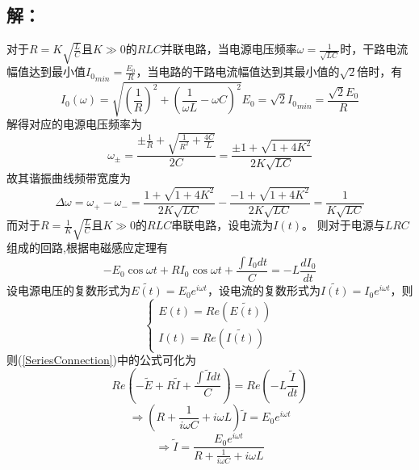 \documentclass[10pt,a4paper]{article}
\theoremstyle{remark}
\begin{document}
\subsection{解：}
对于$R = K\sqrt{\frac{L}{C}}$且$K\gg 0$的$RLC$并联电路，当电源电压频率$\omega = \frac{1}{\sqrt{LC}}$时，干路电流幅值达到最小值${I_0}_{min} = \frac{E_0}{R}$，当电路的干路电流幅值达到其最小值的$\sqrt{2}$倍时，有
\[
I_0(\omega) = \sqrt{(\frac{1}{R})^2+(\frac{1}{\omega L}-\omega C)^2}E_0 = \sqrt{2}{I_0}_{min} = \frac{\sqrt{2}E_0}{R}
\]
解得对应的电源电压频率为
\[
\omega_{\pm} = \frac{\pm\frac{1}{R} + \sqrt{\frac{1}{R^2} + \frac{4C}{L}}}{2C} = \frac{\pm1 + \sqrt{1+4K^2}}{2K\sqrt{LC}}
\]
故其谐振曲线频带宽度为
\[
\Delta\omega = \omega_ + -\omega_- = \frac{1 + \sqrt{1+4K^2}}{2K\sqrt{LC}} - \frac{- 1 + \sqrt{1+4K^2}}{2K\sqrt{LC}} = \frac{1}{K\sqrt{LC}}
\]
而对于$R = \frac{1}{K}\sqrt{\frac{L}{C}}$且$K\gg 0$的$RLC$串联电路，设电流为$I(t)$。 则对于电源与$LRC$组成的回路,根据电磁感应定理有
\begin{equation}
\label{SeriesConnection}
- E_0\cos\omega t + RI_0\cos\omega t + \frac{\int I_0dt}{C} = - L\frac{dI_0}{dt}
\end{equation}
设电源电压的复数形式为$\widetilde{E(t)} = E_0e^{i\omega t}$，设电流的复数形式为$\widetilde{I(t)} = I_0e^{i\omega t}$，则
\[
\left\{\begin{array}{l}
E(t) = Re(\widetilde{E(t)})\\
I(t) = Re(\widetilde{I(t)})
\end{array}\right.
\]
则(\ref{SeriesConnection})中的公式可化为
\[
Re(- \widetilde{E} + R\widetilde{I} + \frac{\int\widetilde{I}dt}{C}) = Re(- L\frac{\widetilde{I}}{dt})
\]
\[
\Rightarrow(R + \frac{1}{i\omega C} + i\omega L)\widetilde{I} = E_0e^{i\omega t}
\]
\[
\Rightarrow \widetilde{I} = \frac{E_0e^{i\omega t}}{R + \frac{1}{i\omega C} + i\omega L}
\]
\end{document}
